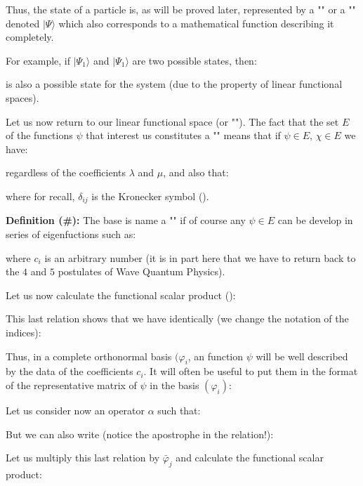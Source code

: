 	Thus, the state of a particle is, as will be proved later, represented by a "" or a "" denoted $|\Psi\rangle$ which also corresponds to a mathematical function describing it completely.

	For example, if $|\Psi_1\rangle$ and $|\Psi_1\rangle$ are two possible states, then:
	
	is also a possible state for the system (due to the property of linear functional  spaces).

	Let us now return to our linear functional  space (or ""). The fact that the set $E$ of the functions $\psi$ that interest us constitutes a "\label{linear functional space}" means that if $\psi\in E$, $\chi\in E$ we have:
	
	regardless of the coefficients $\lambda$ and $\mu$, and also that:
	
	where for recall, $\delta_{ij}$ is the Kronecker symbol ().
	
	\textbf{Definition (\#\mydef):}
	The base is name a "" if of course any $\psi\in E$ can be develop in series of eigenfuctions such as:
	
	where $c_i$ is an arbitrary number (it is in part here that we have to return back to the $4$ and $5$ postulates of Wave Quantum Physics).

Let us now calculate the functional scalar product ():
	
	This last relation shows that we have identically (we change the notation of the indices):
	
	Thus, in a complete orthonormal basis $(\varphi_i$, an function $\psi$ will be well described by the data of the coefficients $c_i$. It will often be useful to put them in the format of the representative matrix of $\psi$ in the basis $(\varphi_i)$:
	
	Let us consider now an operator $\alpha$ such that:
	
	But we can also write (notice the apostrophe in the relation!):
	
	Let us multiply this last relation by $\bar{\varphi}_j$ and calculate the functional scalar product:
	
